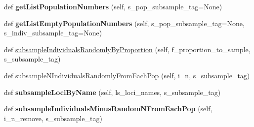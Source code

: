 \begin{DoxyCompactItemize}
\item 
def {\bfseries get\+List\+Population\+Numbers} (self, s\+\_\+pop\+\_\+subsample\+\_\+tag=None)\hypertarget{classnegui_1_1genepopfilemanager_1_1GenepopFileManager_aa14e4cc93f6128be65081e2915969328}{}\label{classnegui_1_1genepopfilemanager_1_1GenepopFileManager_aa14e4cc93f6128be65081e2915969328}

\item 
def {\bfseries get\+List\+Empty\+Population\+Numbers} (self, s\+\_\+pop\+\_\+subsample\+\_\+tag=None, s\+\_\+indiv\+\_\+subsample\+\_\+tag=None)\hypertarget{classnegui_1_1genepopfilemanager_1_1GenepopFileManager_a05c943d32cf60349e9430ab9bd53e7d2}{}\label{classnegui_1_1genepopfilemanager_1_1GenepopFileManager_a05c943d32cf60349e9430ab9bd53e7d2}

\item 
def \hyperlink{classnegui_1_1genepopfilemanager_1_1GenepopFileManager_a5c85ac4838fd6919be1c408bcd39f54e}{subsample\+Individuals\+Randomly\+By\+Proportion} (self, f\+\_\+proportion\+\_\+to\+\_\+sample, s\+\_\+subsample\+\_\+tag)
\item 
def \hyperlink{classnegui_1_1genepopfilemanager_1_1GenepopFileManager_affaeb9457d84736dc1f289d600808f56}{subsample\+N\+Individuals\+Randomly\+From\+Each\+Pop} (self, i\+\_\+n, s\+\_\+subsample\+\_\+tag)
\item 
def {\bfseries subsample\+Loci\+By\+Name} (self, ls\+\_\+loci\+\_\+names, s\+\_\+subsample\+\_\+tag)\hypertarget{classnegui_1_1genepopfilemanager_1_1GenepopFileManager_afa08aba8e7a78951a6c0583aac52c9af}{}\label{classnegui_1_1genepopfilemanager_1_1GenepopFileManager_afa08aba8e7a78951a6c0583aac52c9af}

\item 
def {\bfseries subsample\+Individuals\+Minus\+Random\+N\+From\+Each\+Pop} (self, i\+\_\+n\+\_\+remove, s\+\_\+subsample\+\_\+tag)\hypertarget{classnegui_1_1genepopfilemanager_1_1GenepopFileManager_a97b12689980e0d6ce31c5882af1fd4e3}{}\label{classnegui_1_1genepopfilemanager_1_1GenepopFileManager_a97b12689980e0d6ce31c5882af1fd4e3}


\end{DoxyCompactItemize}
